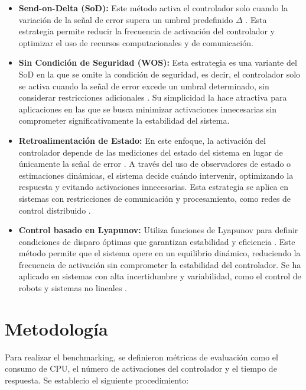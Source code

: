 \documentclass[conference]{IEEEtran}
\begin{document}
\begin{itemize}
    \item \textbf{Send-on-Delta (SoD):} Este m\'etodo activa el controlador solo cuando la variaci\'on de la señal de error supera un umbral predefinido $\Delta$ \cite{Miskowicz2006}. Esta estrategia permite reducir la frecuencia de activaci\'on del controlador y optimizar el uso de recursos computacionales y de comunicaci\'on.
    
    \item \textbf{Sin Condición de Seguridad (WOS):} Esta estrategia es una variante del SoD en la que se omite la condici\'on de seguridad, es decir, el controlador solo se activa cuando la señal de error excede un umbral determinado, sin considerar restricciones adicionales \cite{Durand2018}. Su simplicidad la hace atractiva para aplicaciones en las que se busca minimizar activaciones innecesarias sin comprometer significativamente la estabilidad del sistema.
    
    \item \textbf{Retroalimentación de Estado:} En este enfoque, la activación del controlador depende de las mediciones del estado del sistema en lugar de \'unicamente la señal de error \cite{Lehmann2011}. A trav\'es del uso de observadores de estado o estimaciones din\'amicas, el sistema decide cu\'ando intervenir, optimizando la respuesta y evitando activaciones innecesarias. Esta estrategia se aplica en sistemas con restricciones de comunicaci\'on y procesamiento, como redes de control distribuido \cite{Lunze2010}.
    
    \item \textbf{Control basado en Lyapunov:} Utiliza funciones de Lyapunov para definir condiciones de disparo \'optimas que garantizan estabilidad y eficiencia \cite{Tabuada2007}. Este m\'etodo permite que el sistema opere en un equilibrio din\'amico, reduciendo la frecuencia de activaci\'on sin comprometer la estabilidad del controlador. Se ha aplicado en sistemas con alta incertidumbre y variabilidad, como el control de robots y sistemas no lineales \cite{Heemels2012}.
\end{itemize}

\section{Metodología}
Para realizar el benchmarking, se definieron m\'etricas de evaluaci\'on como el consumo de CPU, el n\'umero de activaciones del controlador y el tiempo de respuesta. Se establecio el siguiente procedimiento:
\end{document}
